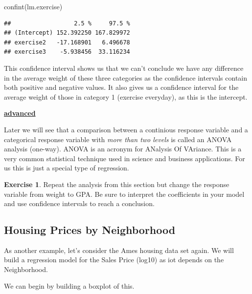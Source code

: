 \documentclass[
]{book}
\newenvironment{Shaded}{\begin{snugshade}}{\end{snugshade}}
\newcommand{\FunctionTok}[1]{\textcolor[rgb]{0.00,0.00,0.00}{#1}}
\newcommand{\NormalTok}[1]{#1}
\newenvironment{rmdblock}[1]
  {\begin{shaded*}
  \centerline{\underline{\textbf{#1}}}

  }
  {
  \end{shaded*}
  }
\newenvironment{advanced}
  {\begin{rmdblock}{advanced}}
  {\end{rmdblock}}
\theoremstyle{definition}
\theoremstyle{definition}
\theoremstyle{definition}
\newtheorem{exercise}{Exercise}[chapter]
\theoremstyle{definition}
\theoremstyle{remark}
\begin{document}
\begin{Shaded}
\begin{Highlighting}[]
\FunctionTok{confint}\NormalTok{(lm.exercise)}
\end{Highlighting}
\end{Shaded}

\begin{verbatim}
##                  2.5 %     97.5 %
## (Intercept) 152.392250 167.829972
## exercise2   -17.168901   6.496678
## exercise3    -5.938456  33.116234
\end{verbatim}

This confidence interval shows us that we can't conclude we have any difference in the average weight of these three categories as the confidence intervals contain both positive and negative values. It also gives us a confidence interval for the average weight of those in category 1 (exercise everyday), as this is the intercept.

\begin{advanced}
Later we will see that a comparison between a continious response variable and a categorical response variable with \emph{more than two levels} is called an ANOVA analysis (one-way). ANOVA is an acronym for ANalysis Of VAriance. This is a very common statistical technique used in science and business applications. For us this is just a special type of regression.
\end{advanced}

\begin{exercise}
\protect\hypertarget{exr:unnamed-chunk-468}{}\label{exr:unnamed-chunk-468}Repeat the analysis from this section but change the response variable from weight to GPA. Be sure to interpret the coefficients in your model and use confidence intervals to reach a conclusion.
\end{exercise}

\hypertarget{housing-prices-by-neighborhood}{%
\subsection{Housing Prices by Neighborhood}\label{housing-prices-by-neighborhood}}

As another example, let's consider the Ames housing data set again. We will build a regression model for the Sales Price (log10) as iot depends on the Neighborhood.

We can begin by building a boxplot of this.
\end{document}
